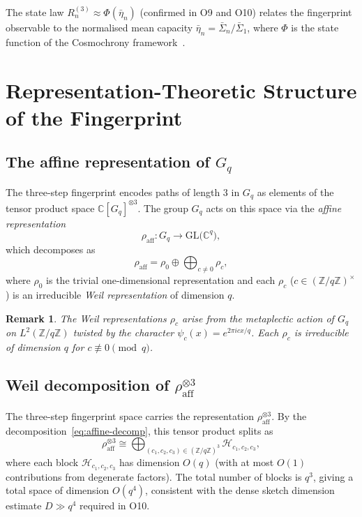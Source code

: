 \documentclass[11pt,a4paper]{article}
\newtheorem{remark}[theorem]{Remark}
\newcommand{\rhoaff}{\rho_{\mathrm{aff}}}
\newcommand{\Sigbar}{\bar{\Sigma}}
\begin{document}
    The state law $R_n^{(3)} \approx \Phi(\bar\eta_n)$ (confirmed in O9 and O10) relates the
    fingerprint observable to the normalised mean capacity $\bar\eta_n = \Sigbar_n / \Sigbar_1$,
    where $\Phi$ is the state function of the Cosmochrony framework~\cite{Cosmochrony}.

  \section{Representation-Theoretic Structure of the Fingerprint}
  \label{sec:weil}

  \subsection{The affine representation of $G_q$}
    \label{sec:affine-rep}

    The three-step fingerprint encodes paths of length $3$ in $G_q$ as elements of the tensor
    product space $\mathbb{C}[G_q]^{\otimes 3}$.
    The group $G_q$ acts on this space via the \emph{affine representation}
    \begin{equation}
      \label{eq:affine-rep}
      \rhoaff : G_q \to \mathrm{GL}\bigl(\mathbb{C}^q\bigr),
    \end{equation}
    which decomposes as
    \begin{equation}
      \label{eq:affine-decomp}
      \rhoaff = \rho_0 \oplus \bigoplus_{c \neq 0} \rho_c,
    \end{equation}
    where $\rho_0$ is the trivial one-dimensional representation and each $\rho_c$ ($c \in
  (\mathbb{Z}/q\mathbb{Z})^\times$) is an irreducible \emph{Weil representation} of dimension $q$.

    \begin{remark}
      The Weil representations $\rho_c$ arise from the metaplectic action of $G_q$ on
      $L^2(\mathbb{Z}/q\mathbb{Z})$ twisted by the character $\psi_c(x) = e^{2\pi i cx/q}$.
      Each $\rho_c$ is irreducible of dimension $q$ for $c \not\equiv 0 \pmod{q}$.
    \end{remark}

  \subsection{Weil decomposition of $\rhoaff^{\otimes 3}$}
    \label{sec:weil-decomp}

    The three-step fingerprint space carries the representation $\rhoaff^{\otimes 3}$.
    By the decomposition~\eqref{eq:affine-decomp}, this tensor product splits as
    \begin{equation}
      \label{eq:tensor-decomp}
      \rhoaff^{\otimes 3} \cong \bigoplus_{(c_1, c_2, c_3) \in (\mathbb{Z}/q\mathbb{Z})^3}
      \mathcal{H}_{c_1, c_2, c_3},
    \end{equation}
    where each block $\mathcal{H}_{c_1, c_2, c_3}$ has dimension $O(q)$ (with at most $O(1)$
    contributions from degenerate factors).
    The total number of blocks is $q^3$, giving a total space of dimension $O(q^4)$, consistent
    with the dense sketch dimension estimate $D \gg q^4$ required in O10.
\end{document}
